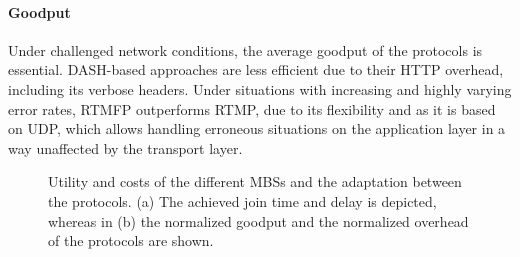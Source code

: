 \paragraph{Goodput}
Under challenged network conditions, the average goodput of the protocols is essential.
\ac{DASH}-based approaches are less efficient due to their \ac{HTTP} overhead, including its verbose headers.
Under situations with increasing and highly varying error rates, \ac{RTMFP} outperforms \ac{RTMP}, due to its flexibility and as it is based on \ac{UDP}, which allows handling erroneous situations on the application layer in a way unaffected by the transport layer.
\begin{figure}[!htb]
	\centering
{}
	\caption[Simulation results on the performance of different MBSs]{Utility and costs of the different MBSs and the adaptation between the protocols. (a) The achieved join time and delay is depicted, whereas in (b) the normalized goodput and the normalized overhead of the protocols are shown.}
	\label{fig:520_SessionAdaptation}
\end{figure}
